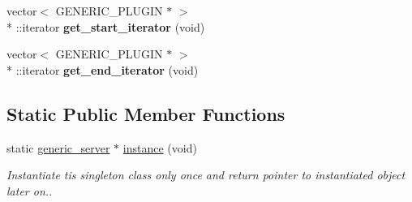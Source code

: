 \begin{DoxyCompactItemize}
\item 
\hypertarget{classgeneric__server_a8825ed14d5512251ffb83bb61679f183}{vector$<$ G\-E\-N\-E\-R\-I\-C\-\_\-\-P\-L\-U\-G\-I\-N $\ast$ $>$\\*
\-::iterator {\bfseries get\-\_\-start\-\_\-iterator} (void)}\label{classgeneric__server_a8825ed14d5512251ffb83bb61679f183}

\item 
\hypertarget{classgeneric__server_ab50a9a74edc5b55f061f54c19ea45d27}{vector$<$ G\-E\-N\-E\-R\-I\-C\-\_\-\-P\-L\-U\-G\-I\-N $\ast$ $>$\\*
\-::iterator {\bfseries get\-\_\-end\-\_\-iterator} (void)}\label{classgeneric__server_ab50a9a74edc5b55f061f54c19ea45d27}

\end{DoxyCompactItemize}
\subsection*{Static Public Member Functions}
\begin{DoxyCompactItemize}
\item 
\hypertarget{classgeneric__server_a59e909661d61abe10a7392a7112641d1}{static \hyperlink{classgeneric__server}{generic\-\_\-server} $\ast$ \hyperlink{classgeneric__server_a59e909661d61abe10a7392a7112641d1}{instance} (void)}\label{classgeneric__server_a59e909661d61abe10a7392a7112641d1}

\begin{DoxyCompactList}\small\item\em Instantiate tis singleton class only once and return pointer to instantiated object later on.. \end{DoxyCompactList}\end{DoxyCompactItemize}
